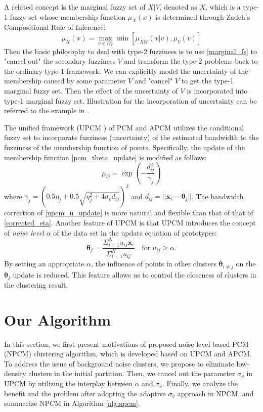 \documentclass[conference]{IEEEtran}
\theoremstyle{definition}
\begin{document}
A related concept is the marginal fuzzy set of $X|V$, denoted as $X$, which is a type-1 fuzzy set whose membership function $\mu_X(x)$ is determined through Zadeh's Compositional Rule of Inference:
\begin{equation}
\label{marginal_fs}
\mu_X(x)=\max_{v\in\Omega_V}\min[\mu_{X|V}(x|v),\mu_V(v)]
\end{equation}
Then the basic philosophy to deal with type-2 fuzziness is to use \eqref{marginal_fs} to "cancel out" the secondary fuzziness $V$ and transform the type-2 problems back to the ordinary type-1 framework. We can explicitly model the uncertainty of the membership caused by some parameter $V$ and "cancel" $V$ to get the type-1 marginal fuzzy set. Then the effect of the uncertainty of $V$ is incorporated into type-1 marginal fuzzy set.
Illustration for the incorporation of uncertainty can be referred to the example in \cite{hou_pcm_2016}.

The unified framework (UPCM \cite{hou_pcm_2016}) of PCM and APCM utilizes the conditional fuzzy set to incorporate fuzziness (uncertainty) of the estimated bandwidth to the fuzziness of the membership function of points. Specifically, the update of the membership function \eqref{pcm_theta_update} is modified as follows:
\begin{equation}
\label{upcm_u_update}
\mu_{ij}=\exp\left(-\frac{d_{ij}^2}{\gamma_j}\right)
\end{equation}
where $\gamma_j=\left(0.5\eta_{j}+0.5\sqrt{\eta_{j}^{2}+4\sigma_vd_{ij}}\right)^2$ and $d_{ij}=||\mathbf{x}_i-\boldsymbol{\theta}_j||$.
The bandwidth correction of \eqref{upcm_u_update} is more natural and flexible than that of that of \eqref{corrected_eta}.
Another feature of UPCM is that UPCM introduces the concept of \emph{noise level} $\alpha$ of the data set in the update equation of prototypes:
\begin{equation}
\label{upcm_theta_update}
\boldsymbol{\theta}_j=\frac{\Sigma_{i=1}^Nu_{ij}\mathbf{x}_i}{\Sigma_{i=1}^Nu_{ij}} \quad \text{for}\;u_{ij}\geq \alpha.
\end{equation}
By setting an appropriate $\alpha$, the influence of points in other clusters $\boldsymbol{\theta}_{i\neq j}$ on the $\boldsymbol{\theta}_j$ update is reduced. This feature allows us to control the closeness of clusters in the clustering result.
\section{Our Algorithm}
\label{sec-3}
In this section, we first present motivations of proposed noise level based PCM (NPCM) clustering algorithm, which is developed based on UPCM and APCM. To address the issue of background noise clusters, we propose to eliminate low-density clusters in the initial partition. Then, we cancel out the parameter $\sigma_v$ in UPCM by utilizing the interplay between $\alpha$ and $\sigma_v$. Finally, we analyze the benefit and the problem after adopting the adaptive $\sigma_v$ approach in NPCM, and summarize NPCM in Algorithm \ref{alg:npcm}.
\end{document}

